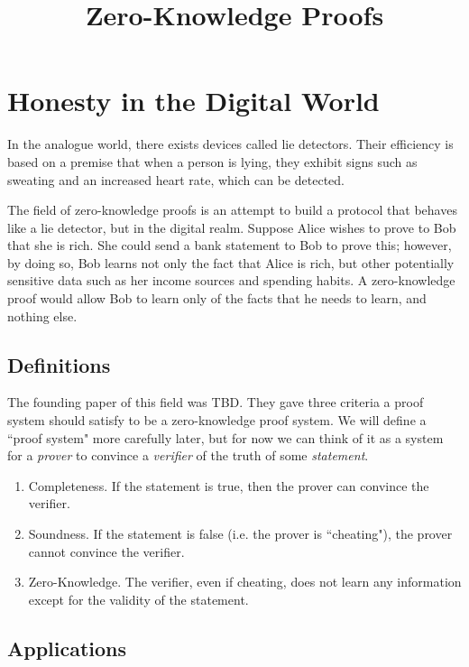 \documentclass{article}
\title{Zero-Knowledge Proofs}
\date{}
\begin{document}
\maketitle

\section*{Honesty in the Digital World}

In the analogue world, there exists devices called lie detectors. Their efficiency is based on a premise that when a person is lying, they exhibit signs such as sweating and an increased heart rate, which can be detected.

The field of zero-knowledge proofs is an attempt to build a protocol that behaves like a lie detector, but in the digital realm. Suppose Alice wishes to prove to Bob that she is rich. She could send a bank statement to Bob to prove this; however, by doing so, Bob learns not only the fact that Alice is rich, but other potentially sensitive data such as her income sources and spending habits. A zero-knowledge proof would allow Bob to learn only of the facts that he needs to learn, and nothing else.

\subsection*{Definitions}

The founding paper of this field was TBD. They gave three criteria a proof system should satisfy to be a zero-knowledge proof system. We will define a ``proof system" more carefully later, but for now we can think of it as a system for a \textit{prover} to convince a \textit{verifier} of the truth of some \textit{statement}.

\begin{enumerate}
\item{Completeness.} If the statement is true, then the prover can convince the verifier.
\item{Soundness.} If the statement is false (i.e. the prover is ``cheating"), the prover cannot convince the verifier.
\item{Zero-Knowledge.} The verifier, even if cheating, does not learn any information except for the validity of the statement.
\end{enumerate}

\subsection*{Applications}
\end{document}
